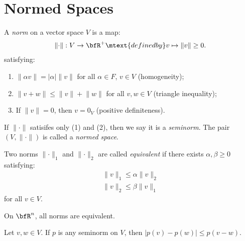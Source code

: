 \section{Normed Spaces}
    \begin{definition}
        A \textit{norm} on a vector space $V$ is a map:
            \begin{equation*}
            \begin{split}
                \lVert \cdot \rVert : V \rightarrow \bfR^+ \mtext{defined by} v \mapsto \lVert v \rVert \geq 0.
            \end{split}
            \end{equation*}
        satisfying:
            \begin{enumerate}[label = (\arabic*)]
                \item $\lVert \alpha v \rVert = |\alpha| \lVert v\rVert$ for all $\alpha \in F$, $v \in V$ (homogeneity);
                \item $\lVert v + w \rVert \leq \lVert v \rVert + \lVert w \rVert$ for all $v,w \in V$ (triangle inequality);
                \item If $\lVert v \rVert = 0$, then $v = 0_V$ (positive definiteness).
            \end{enumerate}
        If $\lVert \cdot \rVert$ satisifes only (1) and (2), then we say it is a \textit{seminorm}. The pair $(V,\lVert \cdot \rVert)$ is called a \textit{normed space}.
    \end{definition}

    \begin{definition}
        Two norms $\lVert \cdot \rVert _1$ and $\lVert \cdot \rVert _2$ are called \textit{equivalent} if there exists $\alpha,\beta \geq 0$ satisfying:
            \begin{equation*}
            \begin{split}
                \lVert v \rVert _1 \leq \alpha \lVert v \rVert _2 \\
                \lVert v \rVert _2 \leq \beta \lVert v \rVert _1
            \end{split}
            \end{equation*}
        for all $v \in V$.
    \end{definition}

    \begin{note}
        On $\bfR^n$, all norms are equivalent.
    \end{note}

    \begin{exercise}\label{ex:seminorm}
        Let $v,w \in V$. If $p$ is any seminorm on $V$, then $|p(v) - p(w)| \leq p(v-w)$.
    \end{exercise}

